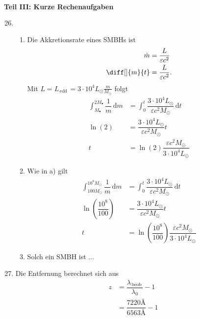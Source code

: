 \documentclass[a4paper,12pt]{article}
\newcommand{\td}{\,\text{d}}
\numberwithin{equation}{section}
\begin{document}
\hfill\\\textbf{Teil III: Kurze Rechenaufgaben}
\begin{enumerate}[label=\arabic*.]
        \setcounter{enumi}{25}
        \item \begin{enumerate}[label=\alph*)]
                \item Die Akkretionsrate eines SMBHs ist
                        \begin{align*} 
                                \dot{m}&=\dfrac{L}{\varepsilon c^2}\\
                                \diff[]{m}{t}&=\dfrac{L}{\varepsilon c^2}
                        .\end{align*} 
                Mit $L=L_{\,\text{edd}\,}=3\cdot 10^4L_\odot \tfrac{m}{M_\odot}$ folgt
                \begin{align*} 
                        \int_{M_\bullet}^{2M_\bullet}\dfrac{1}{m}\td m&=\int_{0}^{t}\dfrac{3\cdot 10^4L_\odot}{\varepsilon c^2M_\odot}\td t\\
                        \ln\left(2\right)&=\dfrac{3\cdot 10^4L_\odot}{\varepsilon c^2M_\odot}t\\
                        t&=\ln\left(2\right)\dfrac{\varepsilon c^2M_\odot}{3\cdot 10^4L_\odot}
                \end{align*} 
                \item Wie in a) gilt
                        \begin{align*} 
                                \int_{100M_\odot}^{10^8M_\odot}\dfrac{1}{m}\td m&=\int_{0}^{t}\dfrac{3\cdot 10^4L_\odot}{\varepsilon c^2M_\odot}\td t\\
                                \ln\left(\dfrac{10^8}{100}\right)&=\dfrac{3\cdot 10^4L_\odot}{\varepsilon c^2M_\odot}t\\
                        t&=\ln\left(\dfrac{10^8}{100}\right)\dfrac{\varepsilon c^2M_\odot}{3\cdot 10^4L_\odot}
                        \end{align*} 
                \item Solch ein SMBH ist ... 
        \end{enumerate}
        \item Die Entfernung berechnet sich aus
                \begin{align*} 
                        z&=\dfrac{\lambda _{\,\text{beob}\,}}{\lambda _0}-1\\
                         &=\dfrac{7220\si{\angstrom}}{6563\si{\angstrom}}-1

\end{align*}
\end{enumerate}
\end{document}
